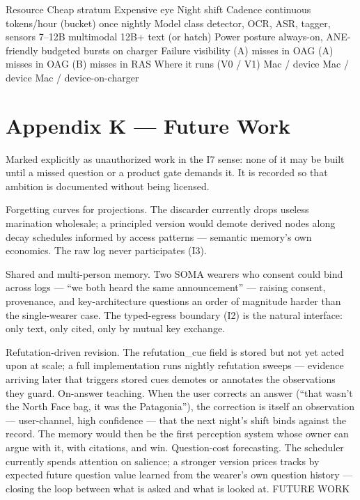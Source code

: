 Resource Cheap stratum Expensive eye Night shift Cadence continuous tokens/hour (bucket) once nightly Model class detector, OCR, ASR, tagger, sensors 7--12B multimodal 12B+ text (or hatch) Power posture always-on, ANE-friendly budgeted bursts on charger Failure visibility (A) misses in OAG (A) misses in OAG (B) misses in RAS Where it runs (V0 / V1) Mac / device Mac / device Mac / device-on-charger

\chapter*{Appendix K --- Future Work}\label{appendix-k-future-work}

Marked explicitly as unauthorized work in the I7 sense: none of it may be built until a missed question or a product gate demands it. It is recorded so that ambition is documented without being licensed.

Forgetting curves for projections. The discarder currently drops useless marination wholesale; a principled version would demote derived nodes along decay schedules informed by access patterns --- semantic memory's own economics. The raw log never participates (I3).

Shared and multi-person memory. Two SOMA wearers who consent could bind across logs --- ``we both heard the same announcement'' --- raising consent, provenance, and key-architecture questions an order of magnitude harder than the single-wearer case. The typed-egress boundary (I2) is the natural interface: only text, only cited, only by mutual key exchange.

Refutation-driven revision. The refutation\_cue field is stored but not yet acted upon at scale; a full implementation runs nightly refutation sweeps --- evidence arriving later that triggers stored cues demotes or annotates the observations they guard. On-answer teaching. When the user corrects an answer (``that wasn't the North Face bag, it was the Patagonia''), the correction is itself an observation --- user-channel, high confidence --- that the next night's shift binds against the record. The memory would then be the first perception system whose owner can argue with it, with citations, and win. Question-cost forecasting. The scheduler currently spends attention on salience; a stronger version prices tracks by expected future question value learned from the wearer's own question history --- closing the loop between what is asked and what is looked at. FUTURE WORK

